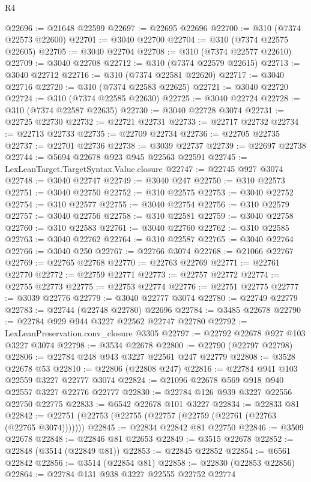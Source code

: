 \begin{lexlean}{R4}
\begin{coremodule}
@22696 := @21648 @22599
@22697 := @22695 @22696
@22700 := @310 (@7374 @22573 @22600)
@22701 := @3040 @22700
@22704 := @310 (@7374 @22575 @22605)
@22705 := @3040 @22704
@22708 := @310 (@7374 @22577 @22610)
@22709 := @3040 @22708
@22712 := @310 (@7374 @22579 @22615)
@22713 := @3040 @22712
@22716 := @310 (@7374 @22581 @22620)
@22717 := @3040 @22716
@22720 := @310 (@7374 @22583 @22625)
@22721 := @3040 @22720
@22724 := @310 (@7374 @22585 @22630)
@22725 := @3040 @22724
@22728 := @310 (@7374 @22587 @22635)
@22730 := @3040 @22728 @3074
@22731 := @22725 @22730
@22732 := @22721 @22731
@22733 := @22717 @22732
@22734 := @22713 @22733
@22735 := @22709 @22734
@22736 := @22705 @22735
@22737 := @22701 @22736
@22738 := @3039 @22737
@22739 := @22697 @22738
@22744 := @5694 @22678 @923 @945 @22563 @22591
@22745 := LexLeanTarget.TargetSyntax.Value.closure
@22747 := @22745 @927 @3074
@22748 := @3040 @22747
@22749 := @3040 @247
@22750 := @310 @22573
@22751 := @3040 @22750
@22752 := @310 @22575
@22753 := @3040 @22752
@22754 := @310 @22577
@22755 := @3040 @22754
@22756 := @310 @22579
@22757 := @3040 @22756
@22758 := @310 @22581
@22759 := @3040 @22758
@22760 := @310 @22583
@22761 := @3040 @22760
@22762 := @310 @22585
@22763 := @3040 @22762
@22764 := @310 @22587
@22765 := @3040 @22764
@22766 := @3040 @250
@22767 := @22766 @3074
@22768 := @21066 @22767
@22769 := @22765 @22768
@22770 := @22763 @22769
@22771 := @22761 @22770
@22772 := @22759 @22771
@22773 := @22757 @22772
@22774 := @22755 @22773
@22775 := @22753 @22774
@22776 := @22751 @22775
@22777 := @3039 @22776
@22779 := @3040 @22777 @3074
@22780 := @22749 @22779
@22783 := @22744 (@22748 @22780) @22696
@22784 := @3485 @22678
@22790 := @22784 @929 @944 @3227 @22562 @22747 @22780
@22792 := LexLeanPreservation.conv_closure @3305
@22797 := @22792 @22678 @927 @103 @3227 @3074
@22798 := @3534 @22678
@22800 := @22790 (@22797 @22798)
@22806 := @22784 @248 @943 @3227 @22561 @247 @22779
@22808 := @3528 @22678 @53
@22810 := @22806 (@22808 @247)
@22816 := @22784 @941 @103 @22559 @3227 @22777 @3074
@22824 := @21096 @22678 @569 @918 @940 @22557 @3227 @22776 @22777
@22830 := @22784 @126 @939 @3227 @22556 @22750 @22775
@22833 := @6542 @22678 @101 @3227
@22834 := @22833 @81
@22842 := @22751 (@22753 (@22755 (@22757 (@22759 (@22761 (@22763 (@22765 @3074)))))))
@22845 := @22834 @22842 @81 @22750
@22846 := @3509 @22678
@22848 := @22846 @81 @22653
@22849 := @3515 @22678
@22852 := @22848 (@3514 (@22849 @81))
@22853 := @22845 @22852
@22854 := @6561 @22842
@22856 := @3514 (@22854 @81)
@22858 := @22830 (@22853 @22856)
@22864 := @22784 @131 @938 @3227 @22555 @22752 @22774

\end{coremodule}
\end{lexlean}
